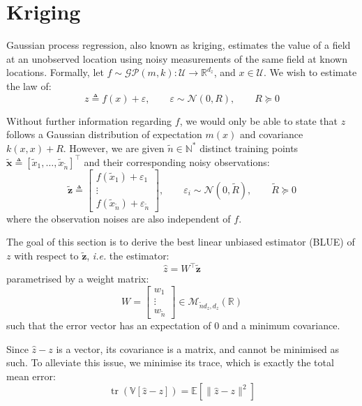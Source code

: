\section{Kriging}\label{sec:kriging}

Gaussian process regression, also known as kriging, estimates the value of a field at an unobserved location using noisy measurements of the same field at known locations. Formally, let $f\sim\mathcal{GP}(m,k):\mathcal{U}\to\mathbb{R}^{d_z}$, and $x\in\mathcal{U}$. We wish to estimate the law of:
\begin{equation}
	z\triangleq f(x)+\varepsilon,\qquad\varepsilon\sim\mathcal{N}(0,R),\qquad R\succeq0
\end{equation}

Without further information regarding $f$, we would only be able to state that $z$ follows a Gaussian distribution of expectation $m(x)$ and covariance $k(x,x)+R$. However, we are given $\tilde{n}\in\mathbb{N}^*$ distinct training points $\tilde{\mathbf{x}}\triangleq[\tilde{x}_1,\dots,\tilde{x}_{\tilde{n}}]^\top$ and their corresponding noisy observations:
\begin{equation}
	\tilde{\mathbf{z}}\triangleq\begin{bmatrix}
		f(\tilde{x}_1)+\varepsilon_1\\\vdots\\f(\tilde{x}_{\tilde{n}})+\varepsilon_{\tilde{n}}
	\end{bmatrix},\qquad\varepsilon_i\sim\mathcal{N}(0,\tilde{R}),\qquad\tilde{R}\succeq0
\end{equation}
where the observation noises are also independent of $f$.

The goal of this section is to derive the best linear unbiased estimator (BLUE) of $z$ with respect to $\tilde{\mathbf{z}}$, \textit{i.e.} the estimator:
\begin{equation}
	\hat{z}=W^\top\tilde{\mathbf{z}}
\end{equation}
parametrised by a weight matrix:
\begin{equation}
	W=\begin{bmatrix}
	w_1\\\vdots\\w_{\tilde{n}}
	\end{bmatrix}\in\mathcal{M}_{\tilde{n}d_z,d_z}(\mathbb{R})
\end{equation}
such that the error vector has an expectation of $0$ and a minimum covariance.

Since $\hat{z}-z$ is a vector, its covariance is a matrix, and cannot be minimised as such. To alleviate this issue, we minimise its trace, which is exactly the total mean error:
\begin{equation}
	\operatorname{tr}(\mathbb{V}[\hat{z}-z])=\mathbb{E}\left[\|\hat{z}-z\|^2\right]\label{eq:error_covariance}
\end{equation}

